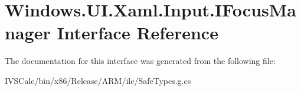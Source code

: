 \hypertarget{interface_windows_1_1_u_i_1_1_xaml_1_1_input_1_1_i_focus_manager}{}\section{Windows.\+U\+I.\+Xaml.\+Input.\+I\+Focus\+Manager Interface Reference}
\label{interface_windows_1_1_u_i_1_1_xaml_1_1_input_1_1_i_focus_manager}


The documentation for this interface was generated from the following file\+:\begin{DoxyCompactItemize}
\item 
I\+V\+S\+Calc/bin/x86/\+Release/\+A\+R\+M/ilc/Safe\+Types.\+g.\+cs\end{DoxyCompactItemize}
